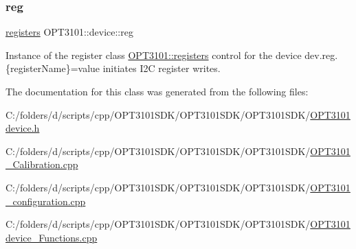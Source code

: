 \mbox{\label{class_o_p_t3101_1_1device_a0b36f012c21e9554a616c65ab3aa528b}} 
\subsubsection{\texorpdfstring{reg}{reg}}
{\footnotesize\ttfamily \mbox{\hyperlink{class_o_p_t3101_1_1registers}{registers}} O\+P\+T3101\+::device\+::reg}



Instance of the register class \mbox{\hyperlink{class_o_p_t3101_1_1registers}{O\+P\+T3101\+::registers}} control for the device dev.\+reg.\{register\+Name\}=value initiates I2C register writes. 



The documentation for this class was generated from the following files\+:\begin{DoxyCompactItemize}
\item 
C\+:/folders/d/scripts/cpp/\+O\+P\+T3101\+S\+D\+K/\+O\+P\+T3101\+S\+D\+K/\+O\+P\+T3101\+S\+D\+K/\mbox{\hyperlink{_o_p_t3101device_8h}{O\+P\+T3101device.\+h}}\item 
C\+:/folders/d/scripts/cpp/\+O\+P\+T3101\+S\+D\+K/\+O\+P\+T3101\+S\+D\+K/\+O\+P\+T3101\+S\+D\+K/\mbox{\hyperlink{_o_p_t3101___calibration_8cpp}{O\+P\+T3101\+\_\+\+Calibration.\+cpp}}\item 
C\+:/folders/d/scripts/cpp/\+O\+P\+T3101\+S\+D\+K/\+O\+P\+T3101\+S\+D\+K/\+O\+P\+T3101\+S\+D\+K/\mbox{\hyperlink{_o_p_t3101__configuration_8cpp}{O\+P\+T3101\+\_\+configuration.\+cpp}}\item 
C\+:/folders/d/scripts/cpp/\+O\+P\+T3101\+S\+D\+K/\+O\+P\+T3101\+S\+D\+K/\+O\+P\+T3101\+S\+D\+K/\mbox{\hyperlink{_o_p_t3101device___functions_8cpp}{O\+P\+T3101device\+\_\+\+Functions.\+cpp}}\end{DoxyCompactItemize}
